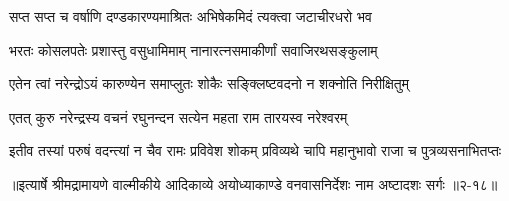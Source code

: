 \twolineshloka
{सप्त सप्त च वर्षाणि दण्डकारण्यमाश्रितः}
{अभिषेकमिदं त्यक्त्वा जटाचीरधरो भव} %

\twolineshloka
{भरतः कोसलपतेः प्रशास्तु वसुधामिमाम्}
{नानारत्नसमाकीर्णां सवाजिरथसङ्कुलाम्} %

\twolineshloka
{एतेन त्वां नरेन्द्रोऽयं कारुण्येन समाप्लुतः}
{शोकैः सङ्क्लिष्टवदनो न शक्नोति निरीक्षितुम्} %

\twolineshloka
{एतत् कुरु नरेन्द्रस्य वचनं रघुनन्दन}
{सत्येन महता राम तारयस्व नरेश्वरम्} %

\twolineshloka
{इतीव तस्यां परुषं वदन्त्यां न चैव रामः प्रविवेश शोकम्}
{प्रविव्यथे चापि महानुभावो राजा च पुत्रव्यसनाभितप्तः} %


॥इत्यार्षे श्रीमद्रामायणे वाल्मीकीये आदिकाव्ये अयोध्याकाण्डे वनवासनिर्देशः नाम अष्टादशः सर्गः ॥२-१८॥

